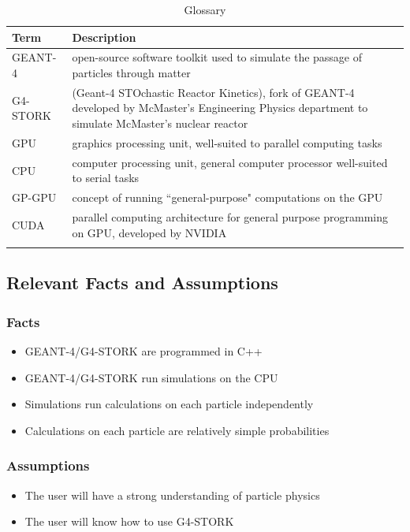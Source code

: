 \documentclass[12pt]{article}
\begin{document}
\begin{table}[h]
\centering
\caption{Glossary}
\begin{tabularx}{\textwidth}{l|X}
\Xhline{2\arrayrulewidth}
\bf Term & \bf Description\\
\hline
GEANT-4 & open-source software toolkit used to simulate the passage of particles through matter\\\hline
G4-STORK & (Geant-4 STOchastic Reactor Kinetics), fork of GEANT-4 developed by McMaster's Engineering Physics department to simulate McMaster's nuclear reactor\\\hline
GPU & graphics processing unit, well-suited to parallel computing tasks\\\hline
CPU & computer processing unit, general computer processor well-suited to serial tasks\\\hline
GP-GPU & concept of running ``general-purpose" computations on the GPU\\\hline
CUDA & parallel computing architecture for general purpose programming on GPU, developed by NVIDIA\\
\Xhline{2\arrayrulewidth}
\end{tabularx}
\end{table}

\subsection{Relevant Facts and Assumptions} %
\subsubsection{Facts}
\begin{itemize}
\item GEANT-4/G4-STORK are programmed in C++
\item GEANT-4/G4-STORK run simulations on the CPU
\item Simulations run calculations on each particle independently
\item Calculations on each particle are relatively simple probabilities
\end{itemize}

\subsubsection{Assumptions}
\begin{itemize}
\item The user will have a strong understanding of particle physics
\item The user will know how to use G4-STORK
\end{itemize}
\end{document}
